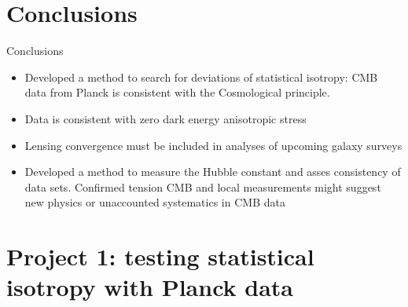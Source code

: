 \documentclass{beamer}
\begin{document}

\section{Conclusions}

\begin{frame}{Conclusions}
\begin{itemize}
\item Developed a method to search for deviations of statistical isotropy: CMB data from Planck is consistent with the Cosmological principle. 
\item Data is consistent with zero dark energy anisotropic stress
\item Lensing convergence must be included in analyses of upcoming galaxy surveys
\item Developed a method to measure the Hubble constant and asses consistency of data sets. Confirmed tension CMB and local measurements might suggest new physics or unaccounted systematics in CMB data    
\end{itemize}
\end{frame}

\section*{Project 1: testing statistical isotropy with Planck data}
\end{document}

